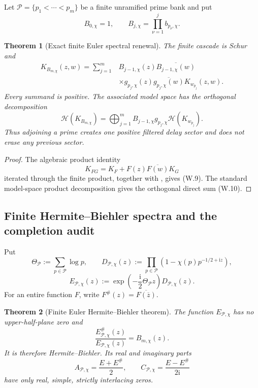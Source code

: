 \documentclass[11pt]{article}
\newtheorem{theorem}{Theorem}[section]
\theoremstyle{definition}
\theoremstyle{remark}
\begin{document}
Let $\mathcal P=\{p_1<\cdots<p_m\}$ be a finite unramified prime bank and put
\[
 B_{0,\chi}=1,
 \qquad
 B_{j,\chi}=\prod_{\nu=1}^jb_{p_\nu,\chi}.
\]

\begin{theorem}[Exact finite Euler spectral renewal]
\label{thm:weil-Euler-renewal}
The finite cascade is Schur and
\[
 \boxed{
 \begin{aligned}
 K_{B_{m,\chi}}(z,w)
 =\sum_{j=1}^m&
 B_{j-1,\chi}(z)\overline{B_{j-1,\chi}(w)}\\
 &\times g_{p_j,\chi}(z)\overline{g_{p_j,\chi}(w)}
 K_{w_{p_j}}(z,w).
 \end{aligned}}
 \tag{W.9}
\]
Every summand is positive.  The associated model space has the orthogonal
decomposition
\[
 \boxed{
 \mathcal H(K_{B_{m,\chi}})
 =\bigoplus_{j=1}^m
 B_{j-1,\chi}g_{p_j,\chi}\mathcal H(K_{w_{p_j}}).}
 \tag{W.10}
\]
Thus adjoining a prime creates one positive filtered delay sector and does
not erase any previous sector.
\end{theorem}

\begin{proof}
The algebraic product identity
\[
 K_{FG}=K_F+F(z)\overline{F(w)}K_G
\]
iterated through the finite product, together with
, gives \textup{(W.9)}.  The standard
model-space product decomposition gives the orthogonal direct sum
\textup{(W.10)}.
\end{proof}

\subsection{Finite Hermite--Biehler spectra and the completion audit}

Put
\[
 \Theta_{\mathcal P}:=\sum_{p\in\mathcal P}\log p,
 \qquad
 D_{\mathcal P,\chi}(z)
 :=\prod_{p\in\mathcal P}
  \left(1-\chi(p)p^{-1/2+\mathrm iz}\right),
\]
\[
 \boxed{
 E_{\mathcal P,\chi}(z)
 :=\exp\!\left(-\frac{\mathrm i}2\Theta_{\mathcal P}z\right)
 D_{\mathcal P,\chi}(z).}
 \tag{W.11}
\]
For an entire function $F$, write $F^\#(z)=\overline{F(\overline z)}$.

\begin{theorem}[Finite Euler Hermite--Biehler theorem]
\label{thm:weil-finite-HB}
The function $E_{\mathcal P,\chi}$ has no upper-half-plane zero and
\[
 \boxed{
 \frac{E_{\mathcal P,\chi}^\#(z)}
 {E_{\mathcal P,\chi}(z)}
 =B_{m,\chi}(z).}
 \tag{W.12}
\]
It is therefore Hermite--Biehler.  Its real and imaginary parts
\[
 A_{\mathcal P,\chi}=\frac{E+E^\#}{2},
 \qquad
 C_{\mathcal P,\chi}=\frac{E-E^\#}{2\mathrm i}
\]
have only real, simple, strictly interlacing zeros.
\end{theorem}
\end{document}

